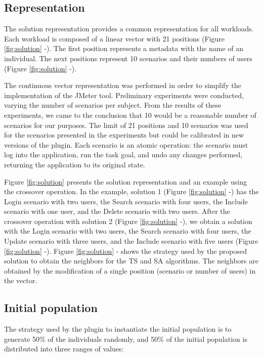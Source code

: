 \documentclass{bmcart}
\begin{document}
\subsection{Representation}

The solution representation provides a common representation for all workloads. Each workload is composed of a linear vector with 21 positions (Figure \ref{fig:solution}  -). The first position represents a metadata with the name of an individual. The next positions represent 10 scenarios and their numbers of users (Figure \ref{fig:solution}  -). 

The continuous vector representation was performed in order to simplify the implementation of the JMeter tool. Preliminary experiments were conducted, varying the number of scenarios per subject. From the results of these experiments, we came to the conclusion that 10 would be a reasonable number of scenarios for our purposes. The limit of 21 positions and 10 scenarios was used for the scenarios presented in the experiments but could be calibrated in new versions of the plugin. Each scenario is an atomic operation: the scenario must log into the application, run the task goal, and undo any changes performed, returning the application to its original state. 

Figure \ref{fig:solution} presents the solution representation and an example using the crossover operation. In the example, solution 1 (Figure \ref{fig:solution}  -) has the Login scenario with two users, the Search scenario with four users, the Include scenario with one user, and the Delete scenario with two users.  After the crossover operation with solution 2 (Figure \ref{fig:solution}  -), we obtain a solution with the Login scenario with two users, the Search scenario with four users, the Update scenario with three users, and the Include scenario with five users (Figure \ref{fig:solution}  -). Figure \ref{fig:solution} - shows the strategy used by the proposed solution to  obtain the neighbors for the TS and SA algorithms. The neighbors are obtained by the modification of a single position (scenario or number of users) in the vector.

\subsection{Initial population}

The strategy used by the plugin to instantiate the initial population is to generate 50\% of the individuals randomly, and 50\% of the initial population is distributed into three ranges of values:
\end{document}
